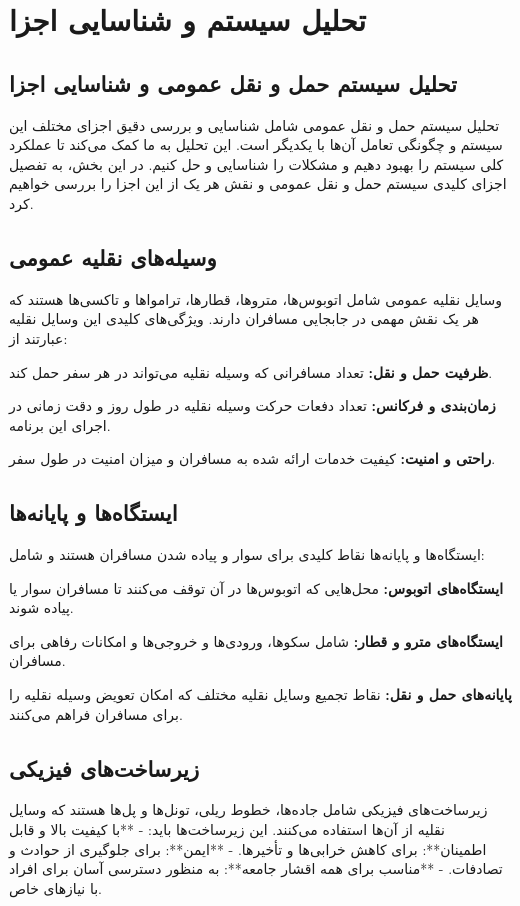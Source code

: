 \chapter{تحلیل سیستم و شناسایی اجزا}
\section{تحلیل سیستم حمل و نقل عمومی و شناسایی اجزا}

تحلیل سیستم حمل و نقل عمومی شامل شناسایی و بررسی دقیق اجزای مختلف این سیستم و چگونگی تعامل آن‌ها با یکدیگر است. این تحلیل به ما کمک می‌کند تا عملکرد کلی سیستم را بهبود دهیم و مشکلات را شناسایی و حل کنیم. در این بخش، به تفصیل اجزای کلیدی سیستم حمل و نقل عمومی و نقش هر یک از این اجزا را بررسی خواهیم کرد.

\section{وسیله‌های نقلیه عمومی}
وسایل نقلیه عمومی شامل اتوبوس‌ها، متروها، قطارها، ترامواها و تاکسی‌ها هستند که هر یک نقش مهمی در جابجایی مسافران دارند. ویژگی‌های کلیدی این وسایل نقلیه عبارتند از:

\textbf{ظرفیت حمل و نقل:}
 تعداد مسافرانی که وسیله نقلیه می‌تواند در هر سفر حمل کند.
 
\textbf{زمان‌بندی و فرکانس:}
تعداد دفعات حرکت وسیله نقلیه در طول روز و دقت زمانی در اجرای این برنامه.

\textbf{راحتی و امنیت:}
کیفیت خدمات ارائه شده به مسافران و میزان امنیت در طول سفر.

\section{ایستگاه‌ها و پایانه‌ها}
ایستگاه‌ها و پایانه‌ها نقاط کلیدی برای سوار و پیاده شدن مسافران هستند و شامل:

\textbf{ایستگاه‌های اتوبوس:}
محل‌هایی که اتوبوس‌ها در آن توقف می‌کنند تا مسافران سوار یا پیاده شوند.

\textbf{ایستگاه‌های مترو و قطار:}
شامل سکوها، ورودی‌ها و خروجی‌ها و امکانات رفاهی برای مسافران.

\textbf{پایانه‌های حمل و نقل:}
نقاط تجمیع وسایل نقلیه مختلف که امکان تعویض وسیله نقلیه را برای مسافران فراهم می‌کنند.

\section{زیرساخت‌های فیزیکی}
زیرساخت‌های فیزیکی شامل جاده‌ها، خطوط ریلی، تونل‌ها و پل‌ها هستند که وسایل نقلیه از آن‌ها استفاده می‌کنند. این زیرساخت‌ها باید:
- **با کیفیت بالا و قابل اطمینان**: برای کاهش خرابی‌ها و تأخیرها.
- **ایمن**: برای جلوگیری از حوادث و تصادفات.
- **مناسب برای همه اقشار جامعه**: به منظور دسترسی آسان برای افراد با نیازهای خاص.

